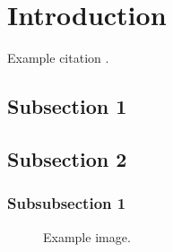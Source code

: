 \documentclass[12pt]{article} %
\begin{document}
\tableofcontents %

\newpage %


\section{Introduction} %

Example citation \cite{Figueredo:2009dg}.


\subsection{Subsection 1} %

\lipsum[1] %


\subsection{Subsection 2} %

\lipsum[2] %


\subsubsection{Subsubsection 1} %

\lipsum[3] %

\begin{figure}[H] %
\caption{Example image.}
\label{fig:speciation}
\end{figure}
\end{document}

